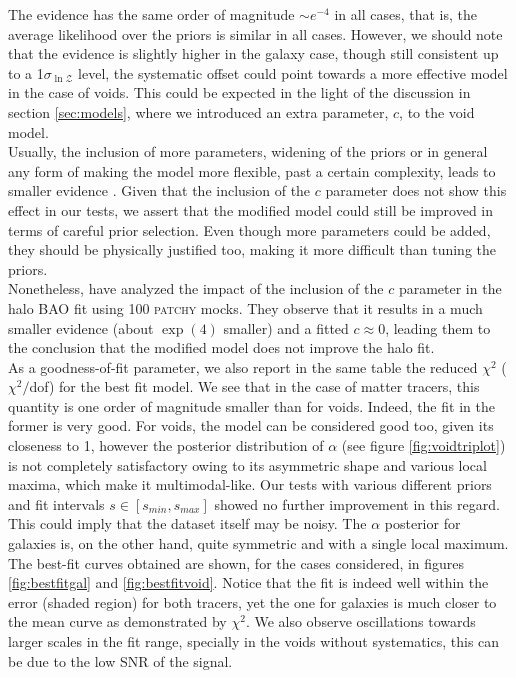 \documentclass[fleqn, usenatbib]{mnras}
\begin{document}
The evidence has the same order of magnitude $\sim e ^{-4}$ in all cases, that is, the average likelihood over the priors is similar in all cases. However, we should note that the evidence is slightly higher in the galaxy case, though still consistent up to a 1$\sigma_{\ln\mathcal{Z}}$  level, the systematic offset could point towards a more effective model in the case of voids. This could be expected in the light of the discussion in section \ref{sec:models}, where we introduced an extra parameter, $c$, to the void model.\\
Usually, the inclusion of more parameters, widening of the priors or in general any form of making the model more flexible, past a certain complexity, leads to smaller evidence \citep{Knuth2015}. Given that the inclusion of the $c$ parameter does not show this effect in our tests, we assert that the modified model could still be improved in terms of careful prior selection. Even though more parameters could be added, they should be physically justified too, making it more difficult than tuning the priors.\\
Nonetheless, \citet{Zhao2019} have analyzed the impact of the inclusion of the $c$ parameter in the halo BAO fit using 100 \textsc{patchy} mocks. They observe that it results in a much smaller evidence (about $\exp(4)$ smaller) and a fitted $c\approx0$, leading them to the conclusion that the modified model does not improve the halo fit.\\
As a goodness-of-fit parameter, we also report in the same table the reduced $\chi^2$ ($\chi^2/$dof) for the best fit model. We see that in the case of matter tracers, this quantity is one order of magnitude smaller than for voids. Indeed, the fit in the former is very good. For voids, the model can be considered good too, given its closeness to 1, however the posterior distribution of $\alpha$ (see figure \ref{fig:voidtriplot}) is not completely satisfactory owing to its asymmetric shape and various local maxima, which make it multimodal-like. Our tests with various different priors and fit intervals $s\in[s_{min}, s_{max}]$ showed no further improvement in this regard. This could imply that the dataset itself may be noisy. The $\alpha$ posterior for galaxies is, on the other hand, quite symmetric and with a single local maximum. The best-fit curves obtained are shown, for the cases considered, in figures \ref{fig:bestfitgal} and \ref{fig:bestfitvoid}. Notice that the fit is indeed well within the error (shaded region) for both tracers, yet the one for galaxies is much closer to the mean curve as demonstrated by $\chi^2$. We also observe oscillations towards larger scales in the fit range, specially in the voids without systematics, this can be due to the low SNR of the signal.\\
\end{document}
